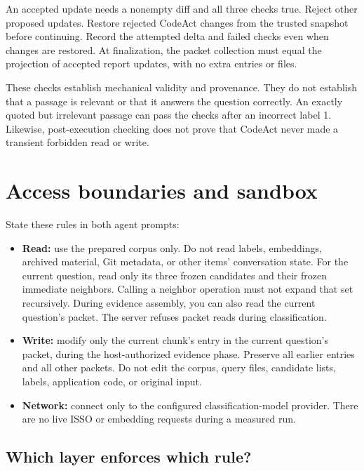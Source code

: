 \documentclass[10pt,letterpaper]{article}
\begin{document}
An accepted update needs a nonempty diff and all three checks true.
Reject other proposed updates. Restore rejected CodeAct changes from the trusted snapshot before continuing.
Record the attempted delta and failed checks even when changes are restored.
At finalization, the packet collection must equal the projection of accepted report updates, with no extra entries or files.

These checks establish mechanical validity and provenance. They do not establish that a passage is relevant or that it answers the question correctly.
An exactly quoted but irrelevant passage can pass the checks after an incorrect label 1.
Likewise, post-execution checking does not prove that CodeAct never made a transient forbidden read or write.

\section{Access boundaries and sandbox}\label{sec:boundaries}

State these rules in both agent prompts:
\begin{itemize}
\item \textbf{Read:} use the prepared corpus only. Do not read labels, embeddings, archived material, Git metadata, or other items' conversation state.
  For the current question, read only its three frozen candidates and their frozen immediate neighbors.
  Calling a neighbor operation must not expand that set recursively.
  During evidence assembly, you can also read the current question's packet. The server refuses packet reads during classification.
\item \textbf{Write:} modify only the current chunk's entry in the current question's packet, during the host-authorized evidence phase.
  Preserve all earlier entries and all other packets. Do not edit the corpus, query files, candidate lists, labels, application code, or original input.
\item \textbf{Network:} connect only to the configured classification-model provider.
  There are no live ISSO or embedding requests during a measured run.
\end{itemize}

\subsection{Which layer enforces which rule?}
\end{document}
